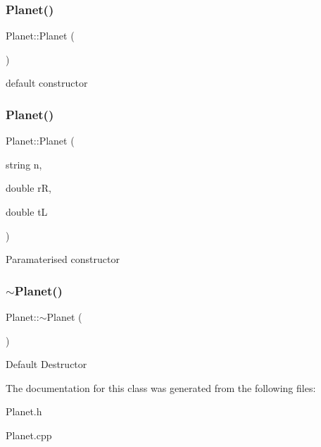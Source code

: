 \subsubsection{\texorpdfstring{Planet()}{Planet()}\hspace{0.1cm}{\footnotesize\ttfamily [1/2]}}
{\footnotesize\ttfamily Planet\+::\+Planet (\begin{DoxyParamCaption}{ }\end{DoxyParamCaption})}

default constructor \mbox{\label{classPlanet_afd66d974488511c495e6e5aa2e886085}} 
\subsubsection{\texorpdfstring{Planet()}{Planet()}\hspace{0.1cm}{\footnotesize\ttfamily [2/2]}}
{\footnotesize\ttfamily Planet\+::\+Planet (\begin{DoxyParamCaption}\item[{string}]{n,  }\item[{double}]{rR,  }\item[{double}]{tL }\end{DoxyParamCaption})}

Paramaterised constructor \mbox{\label{classPlanet_aaa1aaed9d4ef90b4836531edb7b18e0a}} 
\subsubsection{\texorpdfstring{$\sim$\+Planet()}{~Planet()}}
{\footnotesize\ttfamily Planet\+::$\sim$\+Planet (\begin{DoxyParamCaption}{ }\end{DoxyParamCaption})}

Default Destructor 

The documentation for this class was generated from the following files\+:\begin{DoxyCompactItemize}
\item 
Planet.\+h\item 
Planet.\+cpp\end{DoxyCompactItemize}
